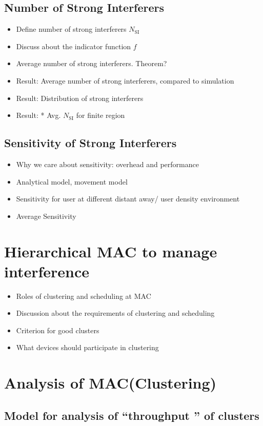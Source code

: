 \documentclass[10pt, conference, letterpaper]{IEEEtran}
\begin{document}
\subsection{Number of Strong Interferers}
\begin{itemize}
\item Define number of strong interferers $N_{\text{SI}}$
\item Discuss about the indicator function $f$
\item Average number of strong interferers. Theorem? 
\item Result: Average number of strong interferers, compared to simulation
\item Result: Distribution of strong interferers
\item Result: * Avg. $N_{\text{SI}}$ for finite region
\end{itemize}
\subsection{Sensitivity of Strong Interferers}
\begin{itemize}
\item Why we care about sensitivity: overhead and performance
\item Analytical model, movement model
\item Sensitivity for user at different distant away/ user density environment
\item Average Sensitivity
\end{itemize}

\section{Hierarchical MAC to manage interference}
\begin{itemize}
\item Roles of clustering and scheduling at MAC
\item Discussion about the requirements of clustering and scheduling
\item Criterion for good clusters
\item What devices should participate in clustering
\end{itemize}

\section{Analysis of MAC(Clustering)}
\subsection{Model for analysis of ``throughput '' of clusters}
\end{document}
